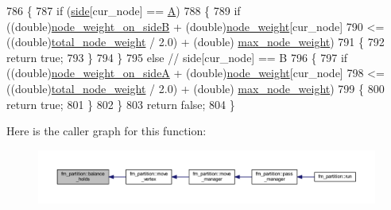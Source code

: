 \begin{DoxyCode}
786 \{
787     \textcolor{keywordflow}{if} (\mbox{\hyperlink{classfm__partition_af83309e781e9658fc0ff923ced087bfc}{side}}[cur\_node] == \mbox{\hyperlink{classfm__partition_a738e75c601403754e61e6dac623fd3ab}{A}})
788     \{
789     \textcolor{keywordflow}{if} ((\textcolor{keywordtype}{double})\mbox{\hyperlink{classfm__partition_a6dc967e385b31096a85f17c51f1f0824}{node\_weight\_on\_sideB}} + (\textcolor{keywordtype}{double})\mbox{\hyperlink{classfm__partition_ae1ba643b4bd6721075ab7b608bcf3cd6}{node\_weight}}[cur\_node]
790         <= ((\textcolor{keywordtype}{double})\mbox{\hyperlink{classfm__partition_a25651e3f78ddbc418ea978ca6b28e0e0}{total\_node\_weight}} / 2.0) + (\textcolor{keywordtype}{double})
      \mbox{\hyperlink{classfm__partition_a8591f5eddac01679e1da3d835eae1cf6}{max\_node\_weight}})
791     \{
792         \textcolor{keywordflow}{return} \textcolor{keyword}{true};
793     \}
794     \}
795     \textcolor{keywordflow}{else}    \textcolor{comment}{// side[cur\_node] == B}
796     \{
797     \textcolor{keywordflow}{if} ((\textcolor{keywordtype}{double})\mbox{\hyperlink{classfm__partition_a8a50d15b399c9ed35d6987c8fb68aa2b}{node\_weight\_on\_sideA}} + (\textcolor{keywordtype}{double})\mbox{\hyperlink{classfm__partition_ae1ba643b4bd6721075ab7b608bcf3cd6}{node\_weight}}[cur\_node]
798         <= ((\textcolor{keywordtype}{double})\mbox{\hyperlink{classfm__partition_a25651e3f78ddbc418ea978ca6b28e0e0}{total\_node\_weight}} / 2.0) + (\textcolor{keywordtype}{double})
      \mbox{\hyperlink{classfm__partition_a8591f5eddac01679e1da3d835eae1cf6}{max\_node\_weight}})
799     \{
800         \textcolor{keywordflow}{return} \textcolor{keyword}{true};
801     \}
802     \}
803     \textcolor{keywordflow}{return} \textcolor{keyword}{false};
804 \}
\end{DoxyCode}
Here is the caller graph for this function\+:\nopagebreak
\begin{figure}[H]
\begin{center}
\leavevmode
\includegraphics[width=350pt]{classfm__partition_a6dc702df474c4ce60e80b3e5a93b7f4d_icgraph}
\end{center}
\end{figure}
\mbox{\label{classfm__partition_af72a9fcc300ab0f202168c819b089e5d}} 
